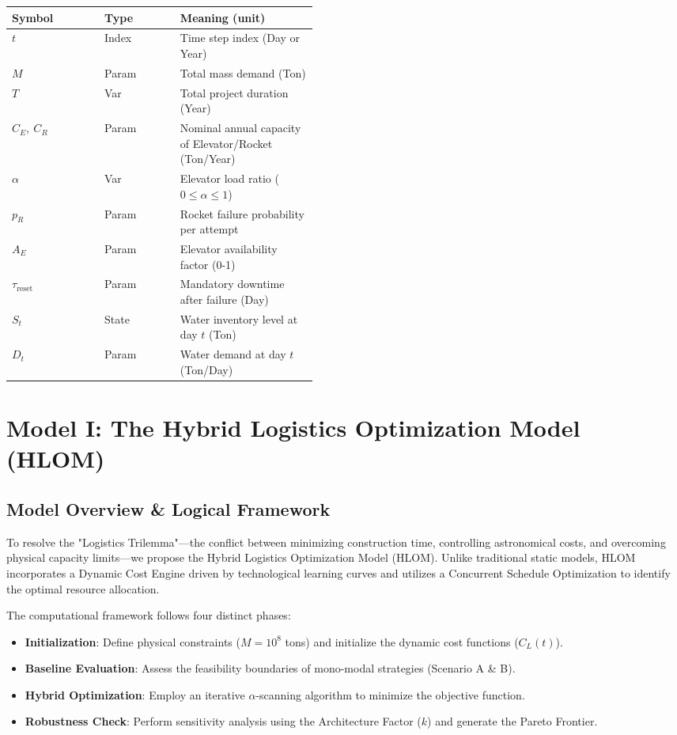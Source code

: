 \documentclass[11pt,letterpaper]{article}
\begin{document}
\begin{longtable}{@{}llp{0.45\linewidth}@{}}
\toprule
Symbol & Type & Meaning (unit)\\
\midrule
$t$ & Index & Time step index (Day or Year)\\
$M$ & Param & Total mass demand (Ton)\\
$T$ & Var & Total project duration (Year)\\
$C_E,\ C_R$ & Param & Nominal annual capacity of Elevator/Rocket (Ton/Year)\\
$\alpha$ & Var & Elevator load ratio ($0 \le \alpha \le 1$)\\
$p_R$ & Param & Rocket failure probability per attempt\\
$A_E$ & Param & Elevator availability factor (0-1)\\
$\tau_{\text{reset}}$ & Param & Mandatory downtime after failure (Day)\\
$S_t$ & State & Water inventory level at day $t$ (Ton)\\
$D_t$ & Param & Water demand at day $t$ (Ton/Day)\\
\bottomrule
\end{longtable}

\section{Model I: The Hybrid Logistics Optimization Model (HLOM)}
\subsection{Model Overview \& Logical Framework}
To resolve the "Logistics Trilemma"---the conflict between minimizing construction time, controlling astronomical costs, and overcoming physical capacity limits---we propose the Hybrid Logistics Optimization Model (HLOM). Unlike traditional static models, HLOM incorporates a Dynamic Cost Engine driven by technological learning curves and utilizes a Concurrent Schedule Optimization to identify the optimal resource allocation.

The computational framework follows four distinct phases:
\begin{itemize}
    \item \textbf{Initialization}: Define physical constraints ($M=10^8$ tons) and initialize the dynamic cost functions ($C_L(t)$).
    \item \textbf{Baseline Evaluation}: Assess the feasibility boundaries of mono-modal strategies (Scenario A \& B).
    \item \textbf{Hybrid Optimization}: Employ an iterative $\alpha$-scanning algorithm to minimize the objective function.
    \item \textbf{Robustness Check}: Perform sensitivity analysis using the Architecture Factor ($k$) and generate the Pareto Frontier.
\end{itemize}
\end{document}

